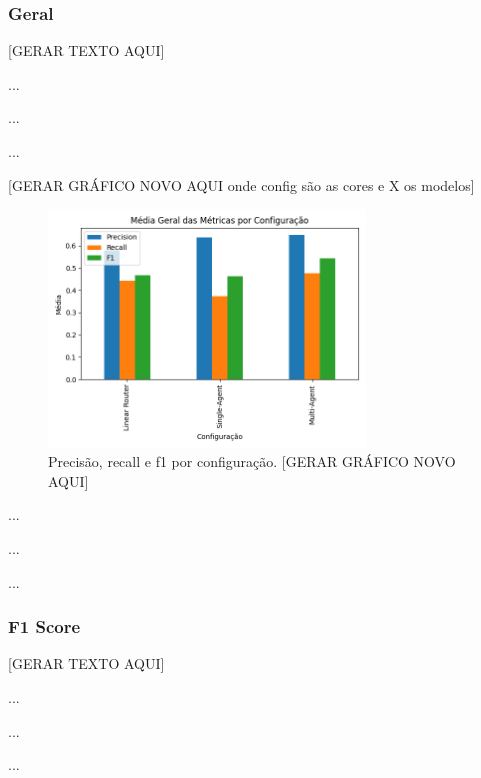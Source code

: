         \subsubsection{Geral}

            [GERAR TEXTO AQUI]

            ...

            ...
            
            ...

            [GERAR GRÁFICO NOVO AQUI onde config são as cores e X os modelos]
            
            \begin{figure}[h!]
                \centering              
                \includegraphics[width=0.75\textwidth]{images_part_2/media_geral_por_configuracao.png}
                \caption{Precisão, recall e f1 por configuração.             [GERAR GRÁFICO NOVO AQUI]}
                \label{fig:aaaa}
            \end{figure}


            ...
            
            ...

            ...
        
        \subsubsection{F1 Score}
        
            
            [GERAR TEXTO AQUI]

            ...

            ...

            ...
            

